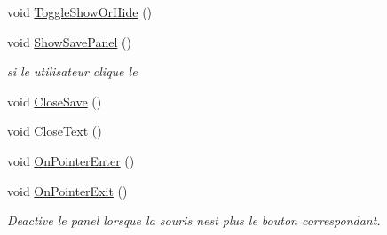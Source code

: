 \begin{DoxyCompactItemize}
void \mbox{\hyperlink{class_menu_visualization_u_i_acc1ed888dd19359811e473ffbd2fa86a}{Toggle\+Show\+Or\+Hide}} ()
\item 
void \mbox{\hyperlink{class_menu_visualization_u_i_aabfef8a72ef59e04916f6d95a1274431}{Show\+Save\+Panel}} ()
\begin{DoxyCompactList}\small\item\em si le utilisateur clique le \end{DoxyCompactList}\item 
void \mbox{\hyperlink{class_menu_visualization_u_i_a262b9857eed5d1a7e749beb653a88cad}{Close\+Save}} ()
\item 
void \mbox{\hyperlink{class_menu_visualization_u_i_a5f689cefeb05b7bfdc19c56179deb6ef}{Close\+Text}} ()
\item 
void \mbox{\hyperlink{class_menu_visualization_u_i_aeb3cdd54092efba28c3a0c693dd64040}{On\+Pointer\+Enter}} ()
\item 
void \mbox{\hyperlink{class_menu_visualization_u_i_a6ebf2452335526b9d63b69ce420d2365}{On\+Pointer\+Exit}} ()
\begin{DoxyCompactList}\small\item\em Deactive le panel lorsque la souris n\textquotesingle{}est plus le bouton correspondant. \end{DoxyCompactList}\end{DoxyCompactItemize}
